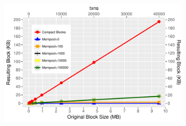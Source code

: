 \begin{figure}\begin{center}
	\includegraphics[width=0.85\textwidth]{graphs/graphene}
	\caption{
	\label{fig:RL}}
\end{center}\end{figure}


